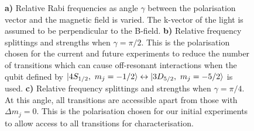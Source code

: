 \begin{figure}
{            \textbf{a)} Relative Rabi frequencies as angle $\gamma$ between the polarisation vector and the magnetic field is varied. The k-vector of the light is assumed to be perpendicular to the B-field.
            \textbf{b)} Relative frequency splittings and strengths when $\gamma = \pi/2$. This is the polarisation chosen for the current and future experiments to reduce the number of transitions which can cause off-resonant interactions when the qubit defined by $\ket{4S_{1/2},~m_j = -1/2} \leftrightarrow \ket{3D_{5/2},~m_j = -5/2}$ is used.
            \textbf{c)} Relative frequency splittings and strengths when $\gamma = \pi/4$. At this angle, all transitions are accessible apart from those with $\Delta m_j = 0$. This is the polarisation chosen for our initial experiments to allow access to all transitions for characterisation.
            }
        \label{fig:quadrupole}
    \end{figure}

